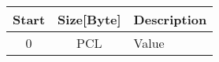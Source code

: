 	\begin{tabular}{c|c|l}
		\textbf{Start} & \textbf{Size[Byte]} & \textbf{Description} \\ \hline
		0 & PCL & Value \\ 
	\end{tabular}